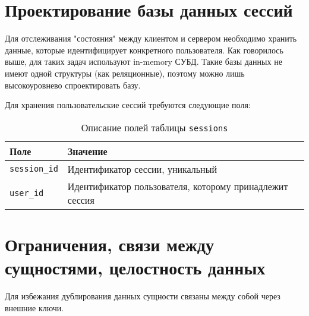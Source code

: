 \section{Проектирование базы данных сессий}
Для отслеживания "состояния" между клиентом и сервером необходимо хранить данные, которые идентифицирует конкретного пользователя. Как говорилось выше, для таких задач используют in-memory СУБД.  
Такие базы данных не имеют одной структуры (как реляционные), поэтому можно лишь высокоуровнево спроектировать базу.

Для хранения пользовательские сессий требуются следующие поля:
\begin{table}[!ht]
    \caption{Описание полей таблицы \texttt{sessions}}
    \label{tbl:sessions}
    \begin{center}
        \begin{tabular}{|p{}p{}|}
            \hline
            \textbf{Поле} & \textbf{Значение} \\\hline
            \texttt{session\_id} & Идентификатор сессии, уникальный \\\hline
            \texttt{user\_id} & Идентификатор пользователя, которому принадлежит сессия \\\hline
        \end{tabular}
    \end{center}
\end{table}

\section{Ограничения, связи между сущностями, целостность данных}
Для избежания дублирования данных сущности связаны между собой через внешние ключи.


